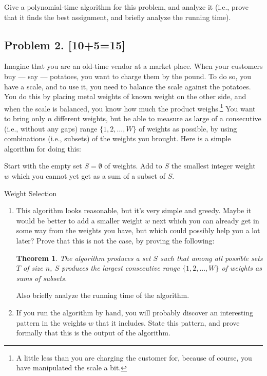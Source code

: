 \documentclass[10pt]{article}
\newtheorem{theorem}[lemma]{Theorem}
\begin{document}
Give a polynomial-time algorithm for this problem, and analyze it (i.e., prove that it finds the best assignment, and briefly analyze the running time).


\subsection*{Problem 2. [10+5=15]}
  Imagine that you are an old-time vendor at a market place. When your customers buy --- say --- potatoes, you want to charge them by the pound.
  To do so, you have a scale, and to use it, you need to balance the scale against the potatoes. You do this by placing metal weights of known weight on the other side, and when the scale is balanced, you know how much the product weighs.\footnote{A little less than you are charging the customer for, because of course, you have manipulated the scale a bit.}
  You want to bring only $n$ different weights, but be able to measure as large of a consecutive (i.e., without any gaps) range $\{1, 2, \ldots, W\}$ of weights as possible, by using combinations (i.e., subsets) of the weights you brought. Here is a simple algorithm for doing this:

  \begin{algorithm}[htb]
  \begin{algorithmic}
    \STATE Start with the empty set $S = \emptyset$ of weights.
       \STATE Add to $S$ the smallest integer weight $w$ which you cannot yet get as a sum of a subset of $S$.
    \ENDFOR
  \end{algorithmic}
\caption{Weight Selection \label{alg:weights}}
\end{algorithm}

\begin{enumerate}
\item This algorithm looks reasonable, but it's very simple and greedy. Maybe it would be better to add a smaller weight $w$ next which you can already get in some way from the weights you have, but which could possibly help you a lot later? Prove that this is not the case, by proving the following:

\begin{theorem}
  The algorithm produces a set $S$ such that among all possible sets $T$ of size $n$, $S$ produces the largest consecutive range $\{1, 2, \ldots, W\}$ of weights as sums of subsets.
\end{theorem}

Also briefly analyze the running time of the algorithm.

\item If you run the algorithm by hand, you will probably discover an interesting pattern in the weights $w$ that it includes. State this pattern, and prove formally that this is the output of the algorithm.
\end{enumerate}
\end{document}
